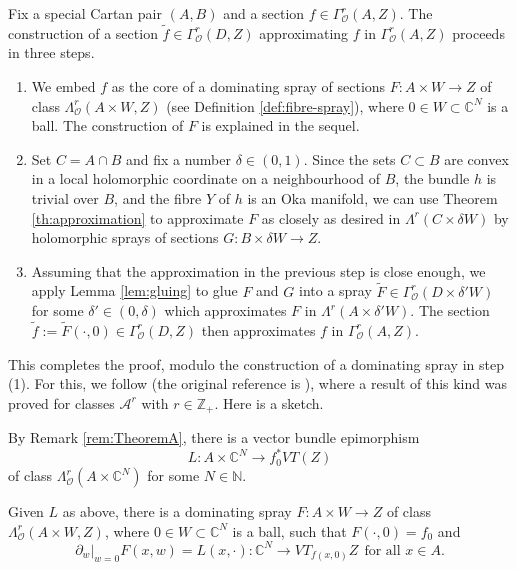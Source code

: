 \documentclass[11pt]{amsart}
\numberwithin{equation}{section}
\theoremstyle{definition}
\newcommand\Ascr{\mathscr{A}}
\newcommand\Oscr{\mathscr{O}}
\newcommand\C{\mathbb{C}}
\newcommand\N{\mathbb{N}}
\newcommand\Z{\mathbb{Z}}
\newcommand\wt{\widetilde}
\newcommand\di{\partial}
\begin{document}
Fix a special Cartan pair $(A,B)$ and a section $f\in \Gamma^r_{\Oscr}(A,Z)$. 
The construction of a section $\tilde f \in \Gamma^r_{\Oscr}(D,Z)$ 
approximating $f$ in $\Gamma^r_{\Oscr}(A,Z)$ proceeds in three steps.
%
\begin{enumerate}[\rm (1)]
\item We embed $f$ as the core of a dominating spray of sections
$F:A\times W\to Z$ of class $\Lambda^r_{\Oscr}(A\times W,Z)$
(see Definition \ref{def:fibre-spray}), where $0\in W\subset \C^N$ 
is a ball. The construction of $F$ is explained in the sequel. 
%
\item 
Set $C=A\cap B$ and fix a number $\delta\in (0,1)$. 
Since the sets $C\subset B$ are convex in a local holomorphic coordinate
on a neighbourhood of $B$, the bundle $h$ is trivial over $B$, 
and the fibre $Y$ of $h$ is an Oka manifold, 
we can use Theorem \ref{th:approximation} to approximate $F$ 
as closely as desired in $\Lambda^r(C\times \delta W)$
by holomorphic sprays of sections $G:B\times \delta W \to Z$.
%
\item 
Assuming that the approximation in the previous step 
is close enough, we apply Lemma \ref{lem:gluing} to glue $F$ 
and $G$ into a spray $\wt F\in \Gamma^r_\Oscr(D\times \delta' W)$ 
for some $\delta'\in (0,\delta)$ which approximates $F$ 
in $\Lambda^r(A\times \delta' W)$. The section
$\tilde f:= \wt F(\cdotp,0) \in \Gamma^r_{\Oscr}(D,Z)$ 
then approximates $f$ in $\Gamma^r_{\Oscr}(A,Z)$. 
\end{enumerate}

This completes the proof, modulo the construction of a 
dominating spray in step (1). For this, we follow 
\cite[proof of Proposition 8.10.2, p.\ 388]{Forstneric2017E}
(the original reference is \cite[Proposition 4.1]{DrinovecForstneric2008FM}), 
where a result of this kind was proved for classes $\Ascr^r$ with $r\in\Z_+$.
Here is a sketch.

By Remark \ref{rem:TheoremA}, there is a vector bundle epimorphism 
\[
	L:A\times \C^N\longrightarrow f_0^* VT(Z)
\] 
of class $\Lambda^r_\Oscr(A\times\C^N)$ for some $N\in \N$.

 Given $L$ as above, there is a dominating spray 
$F:A\times W\to Z$ of class $\Lambda^r_{\Oscr}(A\times W,Z)$,
where $0\in W\subset \C^N$ is a ball, such that 
$F(\cdotp,0)=f_0$ and 
\begin{equation}\label{eq:L}
    	\di_w|_{w=0} F(x,w) = L(x,\cdotp): \C^N  \to  VT_{f(x,0)} Z
	\ \ \text{for all $x\in A$}.
\end{equation}
\end{document}
